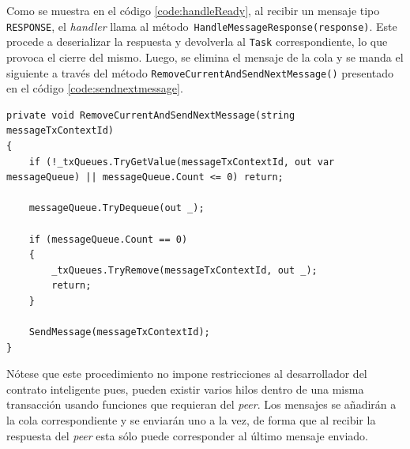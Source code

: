 Como se muestra en el código \ref{code:handleReady}, al recibir un mensaje tipo \texttt{RESPONSE}, el \textit{handler} llama al método\texttt{ HandleMessageResponse(response)}. Este procede a deserializar la respuesta y devolverla al \texttt{Task} correspondiente, lo que provoca el cierre del mismo. Luego, se elimina el mensaje de la cola y se manda el siguiente a través del método 
\texttt{RemoveCurrentAndSendNextMessage()} presentado en el código \ref{code:sendnextmessage}.\\

\begin{lstlisting}[caption={Función \texttt{RemoveCurrentAndSendNextMessage(...)} }]
 private void RemoveCurrentAndSendNextMessage(string messageTxContextId)
{
    if (!_txQueues.TryGetValue(messageTxContextId, out var messageQueue) || messageQueue.Count <= 0) return;

    messageQueue.TryDequeue(out _);

    if (messageQueue.Count == 0)
    {
        _txQueues.TryRemove(messageTxContextId, out _);
        return;
    }

    SendMessage(messageTxContextId);
}
\end{lstlisting}

Nótese que este procedimiento no impone restricciones al desarrollador del contrato inteligente pues, pueden existir varios hilos dentro de una misma transacción usando funciones que requieran del \textit{peer}. Los mensajes se añadirán a la cola correspondiente y se enviarán uno a la vez, de forma que al recibir la respuesta del \textit{peer} esta sólo puede corresponder al último mensaje enviado.

